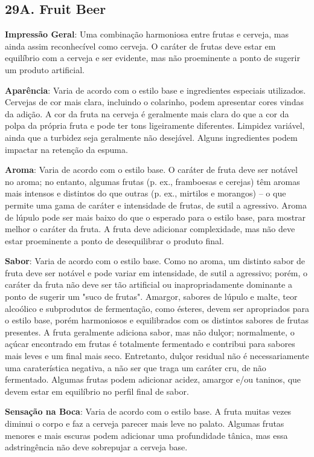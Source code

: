 \subsection*{29A. Fruit Beer}
\textbf{Impressão Geral}: Uma combinação harmoniosa entre frutas e cerveja, mas ainda assim reconhecível como cerveja. O caráter de frutas deve estar em equilíbrio com a cerveja e ser evidente, mas não proeminente a ponto de sugerir um produto artificial.

\textbf{Aparência}: Varia de acordo com o estilo base e ingredientes especiais utilizados. Cervejas de cor mais clara, incluindo o colarinho, podem apresentar cores vindas da adição. A cor da fruta na cerveja é geralmente mais clara do que a cor da polpa da própria fruta e pode ter tons ligeiramente diferentes. Limpidez variável, ainda que a turbidez seja geralmente não desejável. Alguns ingredientes podem impactar na retenção da espuma.

\textbf{Aroma}: Varia de acordo com o estilo base. O caráter de fruta deve ser notável no aroma; no entanto, algumas frutas (p. ex., framboesas e cerejas) têm aromas mais intensos e distintos do que outras (p. ex., mirtilos e morangos) – o que permite uma gama de caráter e intensidade de frutas, de sutil a agressivo. Aroma de lúpulo pode ser mais baixo do que o esperado para o estilo base, para mostrar melhor o caráter da fruta. A fruta deve adicionar complexidade, mas não deve estar proeminente a ponto de desequilibrar o produto final.

\textbf{Sabor}: Varia de acordo com o estilo base. Como no aroma, um distinto sabor de fruta deve ser notável e pode variar em intensidade, de sutil a agressivo; porém, o caráter da fruta não deve ser tão artificial ou inapropriadamente dominante a ponto de sugerir um "suco de frutas". Amargor, sabores de lúpulo e malte, teor alcoólico e subprodutos de fermentação, como ésteres, devem ser apropriados para o estilo base, porém harmoniosos e equilibrados com os distintos sabores de frutas presentes. A fruta geralmente adiciona sabor, mas não dulçor; normalmente, o açúcar encontrado em frutas é totalmente fermentado e contribui para sabores mais leves e um final mais seco. Entretanto, dulçor residual não é necessariamente uma caraterística negativa, a não ser que traga um caráter cru, de não fermentado. Algumas frutas podem adicionar acidez, amargor e/ou taninos, que devem estar em equilíbrio no perfil final de sabor.

\textbf{Sensação na Boca}: Varia de acordo com o estilo base. A fruta muitas vezes diminui o corpo e faz a cerveja parecer mais leve no palato. Algumas frutas menores e mais escuras podem adicionar uma profundidade tânica, mas essa adstringência não deve sobrepujar a cerveja base.


